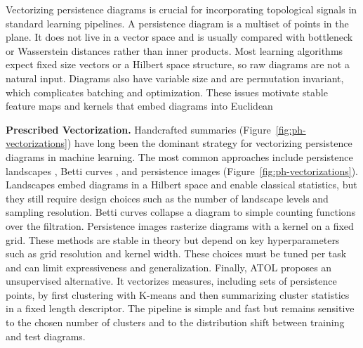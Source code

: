 Vectorizing persistence diagrams is crucial for incorporating topological signals in standard learning pipelines. A persistence diagram is a multiset of points in the plane. It does not live in a vector space and is usually compared with bottleneck or Wasserstein distances rather than inner products. Most learning algorithms expect fixed size vectors or a Hilbert space structure, so raw diagrams are not a natural input. Diagrams also have variable size and are permutation invariant, which complicates batching and optimization. These issues motivate stable feature maps and kernels that embed diagrams into Euclidean 

\textbf{Prescribed Vectorization.} Handcrafted summaries (Figure~\ref{fig:ph-vectorizations}) have long been the dominant strategy for vectorizing persistence diagrams in machine learning. The most common approaches include persistence landscapes \cite{persistence_landscapes}, Betti curves \cite{betti_curves}, and persistence images \cite{persistence_images} (Figure~\ref{fig:ph-vectorizations}). Landscapes embed diagrams in a Hilbert space and enable classical statistics, but they still require design choices such as the number of landscape levels and sampling resolution. Betti curves collapse a diagram to simple counting functions over the filtration. Persistence images rasterize diagrams with a kernel on a fixed grid. These methods are stable in theory but depend on key hyperparameters such as grid resolution and kernel width. These choices must be tuned per task and can limit expressiveness and generalization. Finally, ATOL \cite{atol} proposes an unsupervised alternative. It vectorizes measures, including sets of persistence points, by first clustering with K-means and then summarizing cluster statistics in a fixed length descriptor. The pipeline is simple and fast but remains sensitive to the chosen number of clusters and to the distribution shift between training and test diagrams.

